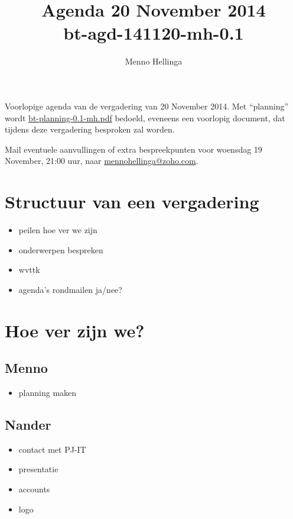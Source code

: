 \documentclass[a4paper, 10pt]{article}
\begin{document}
\frenchspacing
\title{Agenda 20 November 2014\\bt-agd-141120-mh-0.1}
\author{Menno Hellinga}
\date{\empty}

\maketitle

Voorlopige agenda van de vergadering van 20 November 2014. Met ``planning''
wordt \url{bt-planning-0.1-mh.pdf} bedoeld, eveneens een voorlopig document, dat
tijdens deze vergadering besproken zal worden.

Mail eventuele aanvullingen of extra bespreekpunten voor woensdag 19 November,
21:00 uur, naar \url{mennohellinga@zoho.com}.

\tableofcontents

\newpage
\section{Structuur van een vergadering}
\begin{itemize}
	\item peilen hoe ver we zijn
	\item onderwerpen bespreken
	\item wvttk
	\item agenda's rondmailen ja/nee?
\end{itemize}

\section{Hoe ver zijn we?}

\subsection{Menno}
\begin{itemize}
	\item planning maken
\end{itemize}

\subsection{Nander}
\begin{itemize}
	\item contact met PJ-IT
	\item presentatie
	\item accounts
	\item logo
\end{itemize}
\end{document}
